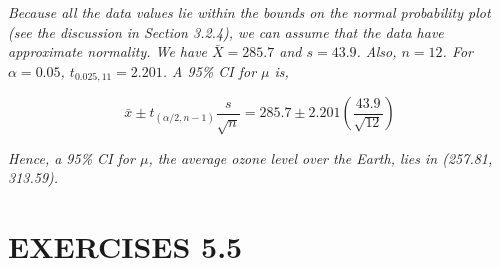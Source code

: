 \begin{flushright}
\textit{Because all the data values lie within the bounds on the normal probability plot (see the discussion in Section 3.2.4), we can assume that the data have approximate normality. We have $\bar{X} = 285.7$ and $s = 43.9$. Also, $n = 12$. For $\alpha = 0.05$, $t_{0.025, 11} = 2.201$. A 95\% CI for $\mu$ is,}
\end{flushright}

\[
\bar{x} \pm t_{(\alpha/2,n-1)} \frac{s}{\sqrt{n}} = 285.7 \pm 2.201 \left( \frac{43.9}{\sqrt{12}} \right)
\]

\textit{Hence, a 95\% CI for $\mu$, the average ozone level over the Earth, lies in (257.81, 313.59).}

\section*{EXERCISES 5.5}

